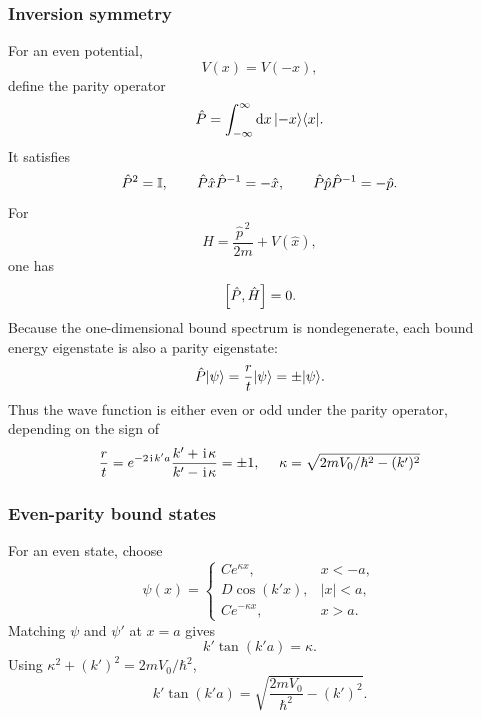 \subsubsection{Inversion symmetry}
For an even potential,
\begin{equation}
 V(x)=V(-x),
\end{equation}
define the parity operator
\begin{equation}
 \hat P=\int_{-\infty}^{\infty}\mathrm{d} x\,|{-x}\rangle\langle{x}|.
\end{equation}
It satisfies
\begin{equation}
 \hat P^2=\mathbb{I},
 \qquad
 \hat P\hat x\hat P^{-1}=-\hat x,
 \qquad
 \hat P\hat p\hat P^{-1}=-\hat p.
\end{equation}
For
\begin{equation}
 \hat H=\frac{\hat p^{\,2}}{2m}+V(\hat x),
\end{equation}
one has
\begin{equation}
 \left[\hat P,\hat H\right]=0.
\end{equation}
Because the one-dimensional bound spectrum is nondegenerate, each bound
energy eigenstate is also a parity eigenstate:
\begin{equation}
 \hat P|{\psi}\rangle=\frac{r}{t}|{\psi}\rangle=\pm|{\psi}\rangle.
\end{equation}
Thus the wave function is either even or odd under the parity operator, depending on the sign of
\begin{align}\label{1d finite well:parity}
    \frac rt=e^{-2\hspace{1pt}\mathrm{i}\hspace{1pt} k'a}\frac{k'+\hspace{1pt}\mathrm{i}\hspace{1pt}\kappa}{k'-\hspace{1pt}\mathrm{i}\hspace{1pt}\kappa}=\pm1,~~~~\kappa=\sqrt{2mV_0/\hbar^2-(k')^2}
\end{align}

\subsubsection{Even-parity bound states}
For an even state, choose
\begin{equation}
 \psi(x)=
 \begin{cases}
 C e^{\kappa x}, & x<-a,\\
 D\cos(k'x), & |x|<a,\\
 C e^{-\kappa x}, & x>a.
 \end{cases}
\end{equation}
Matching $\psi$ and $\psi'$ at $x=a$ gives
\begin{equation}
 \boxed{k'\tan(k'a)=\kappa.}
\end{equation}
Using $\kappa^2+(k')^2=2mV_0/\hbar^2$,
\begin{equation}
 \boxed{k'\tan(k'a)
 =\sqrt{\frac{2mV_0}{\hbar^2}-(k')^2}.}
\end{equation}

